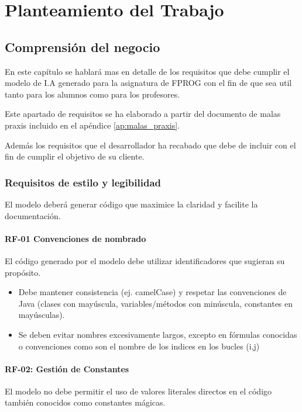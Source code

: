 \part{Planteamiento del Trabajo}

\chapter{Comprensión del negocio}

En este capítulo se hablará mas en detalle de los requisitos que debe cumplir el modelo de I.A  generado para la asignatura de FPROG con el fin de que sea util tanto para los alumnos como para los profesores.

Este apartado de requisitos se ha elaborado a partir del documento de malas praxis incluido en el apéndice  \ref{ap:malas_praxis}.

Además los requisitos que el desarrollador ha recabado que debe de incluir con el fin de cumplir el objetivo de su cliente.

\section{Requisitos de estilo y legibilidad}
\label{ap:analisis_requisitos}
El modelo deberá generar código que maximice la claridad y facilite la documentación.
\subsection{RF-01 Convenciones de nombrado}
El código generado por el modelo debe utilizar identificadores que sugieran su propósito.

\begin{itemize}
    \item Debe mantener consistencia (ej. camelCase) y respetar las convenciones de Java (clases con mayúscula, variables/métodos con minúscula, constantes en mayúsculas).
    \item Se deben evitar nombres excesivamente largos, excepto en fórmulas conocidas o convenciones como son el nombre de los indices en los bucles (i,j)
\end{itemize}

\subsection{RF-02: Gestión de Constantes}
El modelo no debe permitir el uso de valores literales directos en el código también conocidos como constantes mágicas.

